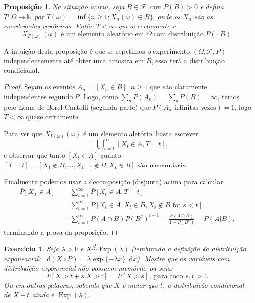 \documentclass[reqno, draft]{book}
\newcommand*\1{\mathds{1}}
\newtheorem{proposition}[theorem]{Proposição}
\newtheorem{exercise}[example]{Exercício}
\DeclareMathOperator{\Exp}{Exp}
\def \distr{\overset{d}{\sim}}
\renewcommand*\d{\mathop{}\!\mathrm{d}}
\DeclareMathOperator*{\mcup}{{\textstyle \bigcup}}
\begin{document}
\begin{proposition}
  Na situação acima, seja $B \in \mathcal{F}$ com $P(B) > 0$ e defina $T:\bar{\Omega} \to \mathbb{N}$ por $T(\omega) = \inf \{n \geq 1; X_n(\omega) \in B\}$, onde os $X_n$ são as coordenadas canônicas. Então $T < \infty$ quase certamente e
  \begin{equation}
    \text{$X_{T(\omega)}(\omega)$ é um elemento aleatório em $\Omega$ com distribuição $P(\cdot | B)$.}
  \end{equation}
\end{proposition}

A intuição desta proposição é que se repetimos o experimento $(\Omega, \mathcal{F}, P)$ independentemente até obter uma amostra em $B$, essa terá a distribuição condicional.

\begin{proof}
  Sejam os eventos $A_n = [X_n \in B]$, $n \geq 1$ que são claramente independentes segundo $\bar{P}$.
  Logo, como $\sum_n \bar{P}(A_n) = \sum_n P(B) = \infty$, temos pelo Lema de Borel-Cantelli (segunda parte) que $\bar{P}(\text{$A_n$ infinitas vezes}) = 1$, logo $T < \infty$ quase certamente.

  Para ver que $X_{T(\omega)}(\omega)$ é um elemento aletório, basta escrever
  \begin{equation}
    [X_{T} \in A] = \mcup_{t=1}^\infty [X_t \in A, T = t],
  \end{equation}
  e observar que tanto $[X_t \in A]$ quanto $[T = t] = [X_1 \not \in B, \dots, X_{t-1} \not \in B, X_t \in B]$ são mensuráveis.

  Finalmente podemos usar a decomposição (disjunta) acima para calcular
  \begin{equation}
    \begin{split}
      \bar{P}[X_T \in A] & = \sum_{t=1}^\infty \bar{P} [X_t \in A, T = t]\\
      & = \sum_{t=1}^\infty \bar{P} [X_t \in A, X_t \in B, X_s \not \in B \text{ for $s < t$}]\\
      & = \sum_{t=1}^\infty P(A \cap B) P(B^c)^{t-1} = \frac{P(A \cap B)}{1-P(B^c)} = P(A | B),
    \end{split}
  \end{equation}
  terminando a prova da proposição.
\end{proof}

\begin{exercise}
  Seja $\lambda > 0$ e $X \distr \Exp(\lambda)$ (lembrando a definição da distribuição exponencial: $\d (X \circ P) = \lambda \exp\{- \lambda x\} \d x$).
  Mostre que as variáveis com distribuição exponencial não possuem memória, ou seja:
  \begin{equation}
    \label{e:sem_memoria}
    P[X > t + s | X > t] = P [X > s], \text{ para todo $s, t > 0$}.
  \end{equation}
  Ou em outras palavras, sabendo que $X$ é maior que $t$, a distribuição condicional de $X - t$ ainda é $\Exp(\lambda)$.
\end{exercise}
\end{document}
